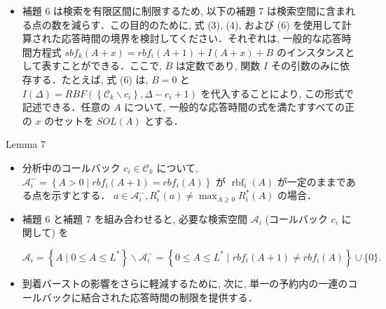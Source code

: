 \begin{frame}{}
    \begin{itemize}
        \item 補題 6 は検索を有限区間に制限するため, 以下の補題 7 は検索空間に含まれる点の数を減らす．この目的のために, 式 (3), (4), および (6) を使用して計算された応答時間の境界を検討してください．それぞれは, 一般的な応答時間方程式 $s b f_{k}(A+x)=r b f_{i}(A+1)+I(A+x)+B$ のインスタンスとして表すことができる．ここで, $B$ は定数であり, 関数 $I$ その引数のみに依存する．たとえば, 式 (6) は, $B=0$ と $I(\Delta)=R B F\left(\left\{\mathcal{C}_{k} \backslash c_{i}\right\}, \Delta-e_{i}+1\right)$ を代入することにより, この形式で記述できる．任意の $A$ について, 一般的な応答時間の式を満たすすべての正の $x$ のセットを $S O L(A)$ とする．
    \end{itemize}
\end{frame}

\begin{frame}[label=lemma7]{Lemma 7}
    \begin{lemma}[]
        \begin{itemize}
            \item 分析中のコールバック $c_{i} \in \mathcal{C}_{k}$ について, $\mathcal{A}_{i}^{-}=\left\{A>0 \mid r b f_{i}(A+1)=r b f_{i}(A)\right\}$ が $\operatorname{rbf}_{i}(A)$ が一定のままである点を示すとする． $a \in \mathcal{A}_{i}^{-}, R_{i}^{*}(a) \neq \max _{A \geq 0} R_{i}^{*}(A)$ の場合．
        \end{itemize}
    \end{lemma}
\end{frame}

\begin{frame}{}
    \begin{itemize}
        \item 補題 6 と補題 7 を組み合わせると, 必要な検索空間 $\mathcal{A}_{i}$ (コールバック $c_{i}$ に関して) を

              \begin{equation*}
                  \mathcal{A}_{i}=\left\{A \mid 0 \leq A \leq L^{*}\right\} \backslash \mathcal{A}_{i}^{-}=\left\{0 \leq A \leq L^{*} \mid r b f_{i}(A+1) \neq r b f_{i}(A)\right\} \cup\{0\} .
              \end{equation*}

        \item 到着バーストの影響をさらに軽減するために, 次に, 単一の予約内の一連のコールバックに結合された応答時間の制限を提供する．
    \end{itemize}
\end{frame}


